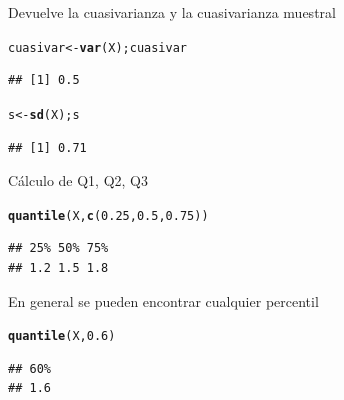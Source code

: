 \documentclass[10pt,a4paper]{article}\usepackage[]{graphicx}\usepackage[]{color}
\makeatletter
\newcommand{\hlnum}[1]{\textcolor[rgb]{0.686,0.059,0.569}{#1}}%
\newcommand{\hlstd}[1]{\textcolor[rgb]{0.345,0.345,0.345}{#1}}%
\newcommand{\hlkwb}[1]{\textcolor[rgb]{0.69,0.353,0.396}{#1}}%
\newcommand{\hlkwd}[1]{\textcolor[rgb]{0.737,0.353,0.396}{\textbf{#1}}}%
\newenvironment{kframe}{%
 \def\at@end@of@kframe{}%
 \ifinner\ifhmode%
  \def\at@end@of@kframe{\end{minipage}}%
  \begin{minipage}{\columnwidth}%
 \fi\fi%
 \def\FrameCommand##1{\hskip\@totalleftmargin \hskip-\fboxsep
 \colorbox{shadecolor}{##1}\hskip-\fboxsep
     \hskip-\linewidth \hskip-\@totalleftmargin \hskip\columnwidth}%
 \MakeFramed {\advance\hsize-\width
   \@totalleftmargin\z@ \linewidth\hsize
   \@setminipage}}%
 {\par\unskip\endMakeFramed%
 \at@end@of@kframe}
\newenvironment{knitrout}{}{} %
\makeatother
\begin{document}
   Devuelve la cuasivarianza y la cuasivarianza muestral
\begin{knitrout}
\color{fgcolor}\begin{kframe}
\begin{alltt}
  \hlstd{cuasivar} \hlkwb{<-} \hlkwd{var}\hlstd{(X); cuasivar}
\end{alltt}
\begin{verbatim}
## [1] 0.5
\end{verbatim}
\begin{alltt}
\hlstd{s} \hlkwb{<-} \hlkwd{sd}\hlstd{(X); s}
\end{alltt}
\begin{verbatim}
## [1] 0.71
\end{verbatim}
\end{kframe}
\end{knitrout}

  Cálculo de Q1, Q2, Q3
\begin{knitrout}
\color{fgcolor}\begin{kframe}
\begin{alltt}
  \hlkwd{quantile}\hlstd{(X,}\hlkwd{c}\hlstd{(}\hlnum{0.25}\hlstd{,} \hlnum{0.5}\hlstd{,} \hlnum{0.75}\hlstd{))}
\end{alltt}
\begin{verbatim}
## 25% 50% 75% 
## 1.2 1.5 1.8
\end{verbatim}
\end{kframe}
\end{knitrout}

En general se pueden encontrar cualquier percentil
\begin{knitrout}
\color{fgcolor}\begin{kframe}
\begin{alltt}
  \hlkwd{quantile}\hlstd{(X,} \hlnum{0.6}\hlstd{)}
\end{alltt}
\begin{verbatim}
## 60% 
## 1.6
\end{verbatim}
\end{kframe}
\end{knitrout}
  
\end{document}
